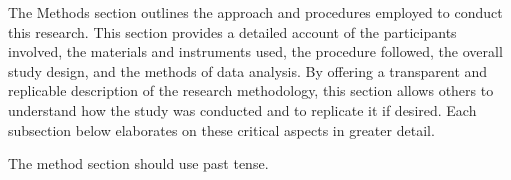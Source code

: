 The Methods section outlines the approach and procedures employed to conduct this research. This section provides a detailed account of the participants involved, the materials and instruments used, the procedure followed, the overall study design, and the methods of data analysis. By offering a transparent and replicable description of the research methodology, this section allows others to understand how the study was conducted and to replicate it if desired. Each subsection below elaborates on these critical aspects in greater detail.

The method section should use past tense.
